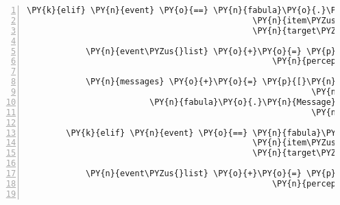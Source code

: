 \begin{Verbatim}[commandchars=\\\{\},numbers=left,firstnumber=1,stepnumber=1]
        \PY{k}{elif} \PY{n}{event} \PY{o}{==} \PY{n}{fabula}\PY{o}{.}\PY{n}{TriesToDropEvent}\PY{p}{(}\PY{n}{identifier}\PY{o}{=}\PY{n}{ID\PYZus{}CASSANDRA}\PY{p}{,}
                                              \PY{n}{item\PYZus{}identifier}\PY{o}{=}\PY{l+s}{\PYZsq{}}\PY{l+s}{cake}\PY{l+s}{\PYZsq{}}\PY{p}{,}
                                              \PY{n}{target\PYZus{}identifier}\PY{o}{=}\PY{n}{ID\PYZus{}KUNI}\PY{p}{)}\PY{p}{:}

            \PY{n}{event\PYZus{}list} \PY{o}{+}\PY{o}{=} \PY{p}{[}\PY{n}{fabula}\PY{o}{.}\PY{n}{PerceptionEvent}\PY{p}{(}\PY{n}{identifier}\PY{o}{=}\PY{n}{ID\PYZus{}CASSANDRA}\PY{p}{,}
                                                  \PY{n}{perception}\PY{o}{=}\PY{l+s}{\PYZsq{}}\PY{l+s}{Du reichst Kuni das Kuchenstück.}\PY{l+s}{\PYZsq{}}\PY{p}{)}\PY{p}{]}

            \PY{n}{messages} \PY{o}{+}\PY{o}{=} \PY{p}{[}\PY{n}{fabula}\PY{o}{.}\PY{n}{Message}\PY{p}{(}\PY{p}{[}\PY{n}{fabula}\PY{o}{.}\PY{n}{PerceptionEvent}\PY{p}{(}\PY{n}{identifier}\PY{o}{=}\PY{n}{ID\PYZus{}KUNI}\PY{p}{,}
                                                          \PY{n}{perception}\PY{o}{=}\PY{l+s}{\PYZsq{}}\PY{l+s}{Cassandra will dir ein Stück Kuchen geben.}\PY{l+s}{\PYZsq{}}\PY{p}{)}\PY{p}{]}\PY{p}{)}\PY{p}{,}
                         \PY{n}{fabula}\PY{o}{.}\PY{n}{Message}\PY{p}{(}\PY{p}{[}\PY{n}{fabula}\PY{o}{.}\PY{n}{SaysEvent}\PY{p}{(}\PY{n}{identifier}\PY{o}{=}\PY{n}{ID\PYZus{}KUNI}\PY{p}{,}
                                                          \PY{n}{text}\PY{o}{=}\PY{l+s}{\PYZsq{}}\PY{l+s}{Nein Danke Cassandra, ich mag nicht so viel Kuchen.}\PY{l+s}{\PYZsq{}}\PY{p}{)}\PY{p}{]}\PY{p}{)}\PY{p}{]}

        \PY{k}{elif} \PY{n}{event} \PY{o}{==} \PY{n}{fabula}\PY{o}{.}\PY{n}{TriesToDropEvent}\PY{p}{(}\PY{n}{identifier}\PY{o}{=}\PY{n}{ID\PYZus{}CASSANDRA}\PY{p}{,}
                                              \PY{n}{item\PYZus{}identifier}\PY{o}{=}\PY{l+s}{\PYZsq{}}\PY{l+s}{cake}\PY{l+s}{\PYZsq{}}\PY{p}{,}
                                              \PY{n}{target\PYZus{}identifier}\PY{o}{=}\PY{n}{ID\PYZus{}CASSANDRA}\PY{p}{)}\PY{p}{:}

            \PY{n}{event\PYZus{}list} \PY{o}{+}\PY{o}{=} \PY{p}{[}\PY{n}{fabula}\PY{o}{.}\PY{n}{PerceptionEvent}\PY{p}{(}\PY{n}{identifier}\PY{o}{=}\PY{n}{ID\PYZus{}CASSANDRA}\PY{p}{,}
                                                  \PY{n}{perception}\PY{o}{=}\PY{l+s}{\PYZsq{}}\PY{l+s}{Ich bin doch auf Diät!}\PY{l+s}{\PYZsq{}}\PY{p}{)}\PY{p}{]}


\end{Verbatim}

